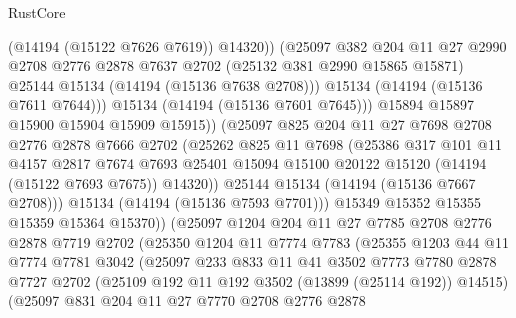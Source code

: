 \begin{lexlean}{RustCore}
\begin{coremodule}
                        (@14194 (@15122 @7626 @7619))
                        @14320))
                    (@25097
                      @382
                      @204
                      @11
                      @27
                      @2990
                      @2708
                      @2776
                      @2878
                      @7637
                      @2702
                      (@25132 @381 @2990 @15865 @15871)
                      @25144
                      @15134
                      (@14194 (@15136 @7638 @2708)))
                    @15134
                    (@14194 (@15136 @7611 @7644)))
                  @15134
                  (@14194 (@15136 @7601 @7645)))
                @15894
                @15897
                @15900
                @15904
                @15909
                @15915))
            (@25097
              @825
              @204
              @11
              @27
              @7698
              @2708
              @2776
              @2878
              @7666
              @2702
              (@25262
                @825
                @11
                @7698
                (@25386
                  @317
                  @101
                  @11
                  @4157
                  @2817
                  @7674
                  @7693
                  @25401
                  @15094
                  @15100
                  @20122
                  @15120
                  (@14194 (@15122 @7693 @7675))
                  @14320))
              @25144
              @15134
              (@14194 (@15136 @7667 @2708)))
            @15134
            (@14194 (@15136 @7593 @7701)))
          @15349
          @15352
          @15355
          @15359
          @15364
          @15370))
      (@25097
        @1204
        @204
        @11
        @27
        @7785
        @2708
        @2776
        @2878
        @7719
        @2702
        (@25350
          @1204
          @11
          @7774
          @7783
          (@25355
            @1203
            @44
            @11
            @7774
            @7781
            @3042
            (@25097
              @233
              @833
              @11
              @41
              @3502
              @7773
              @7780
              @2878
              @7727
              @2702
              (@25109 @192 @11 @192 @3502 (@13899 (@25114 @192)) @14515)
              (@25097
                @831
                @204
                @11
                @27
                @7770
                @2708
                @2776
                @2878

\end{coremodule}
\end{lexlean}
